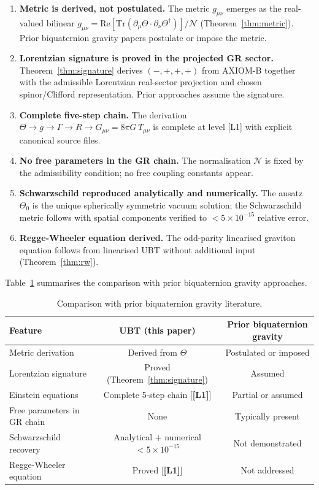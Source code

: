 \documentclass[12pt,a4paper]{article}
\theoremstyle{definition}
\theoremstyle{remark}
\newcommand{\Lone}{\textbf{[L1]}}
\newcommand{\Tr}{\mathrm{Tr}}
\newcommand{\re}{\mathrm{Re}}
\newcommand{\calN}{\mathcal{N}}
\begin{document}
\begin{enumerate}
  \item \textbf{Metric is derived, not postulated.}
        The metric $g_{\mu\nu}$ emerges as the real-valued bilinear
        $g_{\mu\nu} = \re[\Tr(\partial_\mu\Theta \cdot \partial_\nu\Theta^\dagger)]/\calN$
        (Theorem~\ref{thm:metric}).
        Prior biquaternion gravity papers postulate or impose the metric.

  \item \textbf{Lorentzian signature is proved in the projected GR sector.}
        Theorem~\ref{thm:signature} derives $(-,+,+,+)$ from AXIOM-B together
        with the admissible Lorentzian real-sector projection and chosen
        spinor/Clifford representation.
        Prior approaches assume the signature.

  \item \textbf{Complete five-step chain.}
        The derivation $\Theta \to g \to \Gamma \to R \to G_{\mu\nu} = 8\pi G\,T_{\mu\nu}$
        is complete at level [L1] with explicit canonical source files.

  \item \textbf{No free parameters in the GR chain.}
        The normalisation $\calN$ is fixed by the admissibility condition;
        no free coupling constants appear.

  \item \textbf{Schwarzschild reproduced analytically and numerically.}
        The ansatz $\Theta_0$ is the unique spherically symmetric vacuum solution;
        the Schwarzschild metric follows with spatial components verified to
        $< 5\times 10^{-15}$ relative error.

  \item \textbf{Regge-Wheeler equation derived.}
        The odd-parity linearised graviton equation follows from linearised
        UBT without additional input (Theorem~\ref{thm:rw}).
\end{enumerate}

Table~\ref{tab:novelty} summarises the comparison with prior biquaternion
gravity approaches.

\begin{table}[ht]
\centering
\caption{Comparison with prior biquaternion gravity literature.}
\label{tab:novelty}
\begin{tabular}{lcc}
\toprule
\textbf{Feature} & \textbf{UBT (this paper)} & \textbf{Prior biquaternion gravity} \\
\midrule
Metric derivation & Derived from $\Theta$ & Postulated or imposed \\
Lorentzian signature & Proved (Theorem~\ref{thm:signature}) & Assumed \\
Einstein equations & Complete 5-step chain [\Lone] & Partial or assumed \\
Free parameters in GR chain & None & Typically present \\
Schwarzschild recovery & Analytical + numerical $<5\times 10^{-15}$ & Not demonstrated \\
Regge-Wheeler equation & Proved [\Lone] & Not addressed \\
\bottomrule
\end{tabular}
\end{table}
\end{document}
